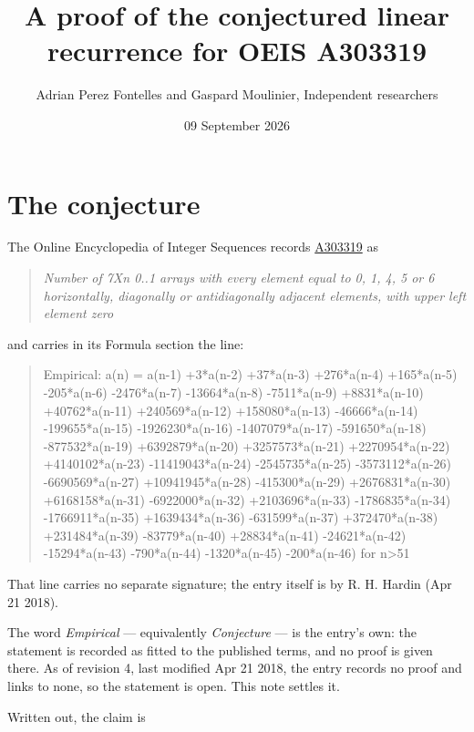 \documentclass[11pt]{article}
\title{A proof of the conjectured linear recurrence for OEIS A303319}
\author{Adrian Perez Fontelles and Gaspard Moulinier, Independent researchers}
\date{09 September 2026}
\theoremstyle{definition}
\begin{document}
\maketitle
\section{The conjecture}

The Online Encyclopedia of Integer Sequences records \href{https://oeis.org/A303319}{A303319} as

\begin{quote}\itshape Number of 7Xn 0..1 arrays with every element equal to 0, 1, 4, 5 or 6 horizontally, diagonally or antidiagonally adjacent elements, with upper left element zero\end{quote}

and carries in its Formula section the line:

\begin{quote}\ttfamily Empirical: a(n) = a(n-1) +3*a(n-2) +37*a(n-3) +276*a(n-4) +165*a(n-5) -205*a(n-6) -2476*a(n-7) -13664*a(n-8) -7511*a(n-9) +8831*a(n-10) +40762*a(n-11) +240569*a(n-12) +158080*a(n-13) -46666*a(n-14) -199655*a(n-15) -1926230*a(n-16) -1407079*a(n-17) -591650*a(n-18) -877532*a(n-19) +6392879*a(n-20) +3257573*a(n-21) +2270954*a(n-22) +4140102*a(n-23) -11419043*a(n-24) -2545735*a(n-25) -3573112*a(n-26) -6690569*a(n-27) +10941945*a(n-28) -415300*a(n-29) +2676831*a(n-30) +6168158*a(n-31) -6922000*a(n-32) +2103696*a(n-33) -1786835*a(n-34) -1766911*a(n-35) +1639434*a(n-36) -631599*a(n-37) +372470*a(n-38) +231484*a(n-39) -83779*a(n-40) +28834*a(n-41) -24621*a(n-42) -15294*a(n-43) -790*a(n-44) -1320*a(n-45) -200*a(n-46) for n>51\end{quote}

That line carries no separate signature; the entry itself is by R. H. Hardin (Apr 21 2018).

The word {\itshape Empirical} --- equivalently {\itshape Conjecture} --- is the entry's own: the statement is recorded as fitted to the published terms, and no proof is given there. As of revision 4, last modified Apr 21 2018, the entry records no proof and links to none, so the statement is open. This note settles it.

Written out, the claim is
\end{document}
